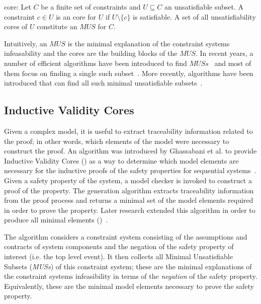 \begin{definition} \unsat core: Let $C$ be a finite set of constraints and $U \subseteq C$ an unsatisfiable subset. A constraint $c \in U$ is an \unsat core for $U$ if $U \setminus \{c\}$ is satisfiable. A set of all unsatisfiability cores of $U$ constitute an $MUS$ for $C$. 
\end{definition}

Intuitively, an $MUS$ is the minimal explanation of the constraint systems infeasability and the \unsat cores are the building blocks of the $MUS$. In recent years, a number of efficient algorithms have been introduced to find $MUSs$~\cite{liffiton2005max} and most of them focus on finding a single such subset~\cite{belov2012towards, belov2013core, belov2012muser2}. More recently, algorithms have been introduced that can find all such minimal unsatisfiable subsets~\cite{GhassabaniGW16, Ghassabani2017EfficientGO,bendik2018online}. 

\subsection{Inductive Validity Cores} Given a complex model, it is useful to extract traceability information related to the proof; in other words, which elements of the model were necessary to construct the proof. An algorithm was introduced by Ghassabani et al. to provide Inductive Validity Cores (\ivc) as a way to determine which model elements are necessary for the inductive proofs of the safety properties for sequential systems~\cite{GhassabaniGW16}. Given a safety property of the system, a model checker is invoked to construct a proof of the property. The \ivc generation algorithm extracts traceability information from the proof process and returns a minimal set of the model elements required in order to prove the property. Later research extended this algorithm in order to produce all minimal \ivc elements (\aivcalg)~\cite{Ghassabani2017EfficientGO,bendik2018online}. 

The \aivcalg algorithm considers a constraint system consisting of the assumptions and contracts of system components and the negation of the safety property of interest (i.e. the top level event). It then collects all Minimal Unsatisfiable Subsets (\textit{MUSs}) of this constraint system; these are the minimal explanations of the constraint systems infeasibility in terms of the \textit{negation} of the safety property. Equivalently, these are the minimal model elements necessary to prove the safety property. 